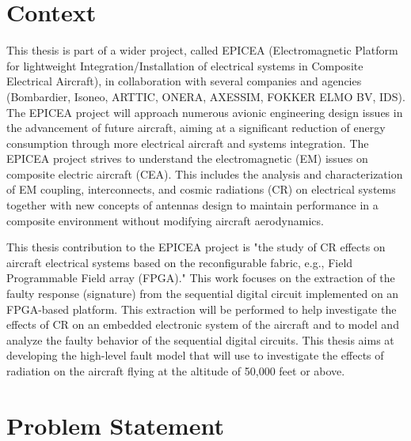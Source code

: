 

\section{Context}
\label{intro}

This thesis is part of a wider project, called EPICEA (Electromagnetic Platform for lightweight 
Integration/Installation of electrical systems in Composite Electrical Aircraft), in collaboration with several 
companies and agencies (Bombardier, Isoneo, ARTTIC, ONERA, AXESSIM, FOKKER ELMO BV, IDS). The EPICEA project will approach
numerous avionic engineering design issues in the advancement of future aircraft, aiming at a significant
reduction of energy consumption through more electrical aircraft and systems integration. The EPICEA project strives to understand the electromagnetic (EM) issues on composite electric aircraft (CEA). This includes the analysis
and characterization of EM coupling, interconnects, and cosmic radiations (CR) on electrical systems together
with new concepts of antennas design to maintain performance in a composite environment without modifying
aircraft aerodynamics.

This thesis contribution to the EPICEA project is "the study of CR effects on aircraft electrical systems based on the reconfigurable fabric, e.g., Field Programmable Field array (FPGA)." This work focuses on the extraction of the faulty response (signature) from the sequential digital circuit implemented on an FPGA-based platform. This extraction will be performed to help investigate the effects of CR on an embedded electronic system of the aircraft and to model and analyze the faulty behavior of the sequential digital circuits. This thesis aims at developing the high-level fault model that will use to investigate the effects of radiation on the aircraft flying at the altitude of 50,000 feet or above. 

\section{Problem Statement}

